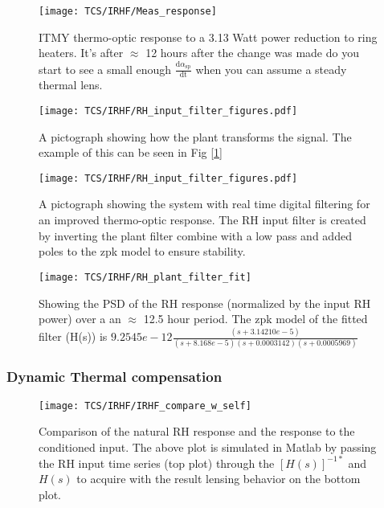 \begin{figure}[H]
 \texttt{[image: TCS/IRHF/Meas\_response]}
 \caption{ITMY thermo-optic response to a 3.13 Watt power reduction to ring heaters. It's after $\approx$ 12 hours after the change was made do you start to see a small enough $\frac{\mathrm{d} \alpha_\mathrm{sp}}{\mathrm{dt}}$ when you can assume a steady thermal lens.}
 \label{fig:meas}
\end{figure}

\begin{figure}[H]
\texttt{[image: TCS/IRHF/RH\_input\_filter\_figures.pdf]}
\caption{A pictograph showing how the plant transforms the signal. The example of this can be seen in Fig [\ref{fig:meas}]}
\label{fig:justplant}
\end{figure}

\begin{figure}[H]
\texttt{[image: TCS/IRHF/RH\_input\_filter\_figures.pdf]}
\caption{A pictograph showing the system with real time digital filtering for an improved thermo-optic response. The RH input filter is created by inverting the plant filter combine with a low pass and added poles to the zpk model to ensure stability.}
\label{fig:plantwfilt}
\end{figure}

\begin{figure}[H]
\texttt{[image: TCS/IRHF/RH\_plant\_filter\_fit]}
\caption{Showing the PSD of the RH response (normalized by the input RH power) over a an $\approx$ 12.5 hour period. The zpk model of the fitted filter (H(s)) is $9.2545e-12 \frac{(s+3.14210e-5)}{(s+8.168e-5)(s+0.0003142)(s+0.0005969)}$}
\label{fig:plant_v_fit}
\end{figure}

\subsubsection{Dynamic Thermal compensation}
\begin{figure}[H]
\texttt{[image: TCS/IRHF/IRHF\_compare\_w\_self]}
\caption{Comparison of the natural RH response and the response to the conditioned input. The above plot is simulated in Matlab by passing the RH input time series (top plot) through the $[H(s)]^{-1*}$ and $H(s)$ to acquire with the result lensing behavior on the bottom plot.}
\label{fig:dynam_comparison}
\end{figure}
\newpage


